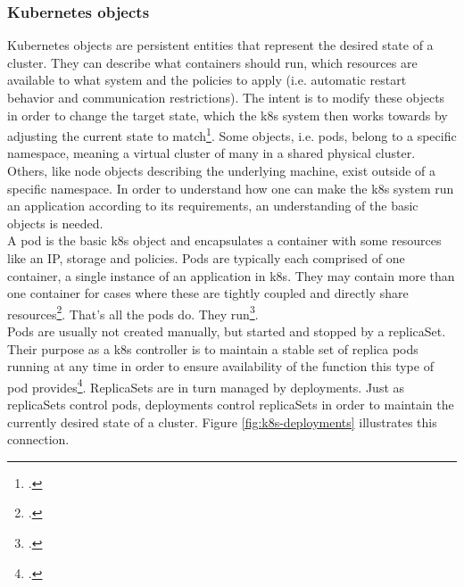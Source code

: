 \subsubsection{Kubernetes objects}
Kubernetes objects are persistent entities that represent the desired state of a cluster. They can describe what containers should run, which resources are available to what system and the policies to apply (i.e. automatic restart behavior and communication restrictions).
The intent is to modify these objects in order to change the target state, which the \gls{k8s} system then works towards by adjusting the current state to match\footcite[][, section 'Understanding Kubernetes Objects']{k8sObjects}.
Some objects, i.e. pods, belong to a specific namespace, meaning a virtual cluster of many in a shared physical cluster. Others, like node objects describing the underlying machine, exist outside of a specific namespace.
In order to understand how one can make the \gls{k8s} system run an application according to its requirements, an understanding of the basic objects is needed. \\
A pod is the basic \gls{k8s} object and encapsulates a container with some resources like an IP, storage and policies. Pods are typically each comprised of one container, a single instance of an application in \gls{k8s}. They may contain more than one container for cases where these are tightly coupled and directly share resources\footcite[][, section 'Understanding Pods']{k8sPods}.
That's all the pods do. They run\footcite[][p. 4]{phippy}. \\
Pods are usually not created manually, but started and stopped by a replicaSet. Their purpose as a \gls{k8s} controller is to maintain a stable set of replica pods running at any time in order to ensure availability of the function this type of pod provides\footcite[][, introductory sentence]{k8sReplicaSets}.
ReplicaSets are in turn managed by deployments. Just as replicaSets control pods, deployments control replicaSets in order to maintain the currently desired state of a cluster.
Figure \ref{fig:k8s-deployments} illustrates this connection. \\

